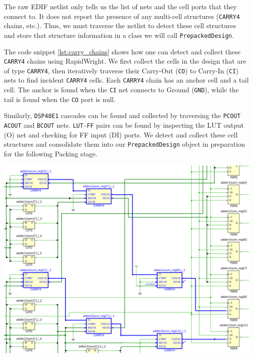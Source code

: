 \begin{multicols}{2}
The raw EDIF netlist only tells us the list of nets and the cell ports that they connect to. 
It does not report the presence of any multi-cell structures (\texttt{CARRY4} chains, etc.). 
Thus, we must traverse the netlist to detect these cell structures and store that structure information in a class we will call \texttt{PrepackedDesign}.

The code snippet \ref{lst:carry_chains} shows how one can detect and collect these \texttt{CARRY4} chains using RapidWright. 
We first collect the cells in the design that are of type \texttt{CARRY4}, then iteratively traverse their Carry-Out (\texttt{CO}) to Carry-In (\texttt{CI}) nets to find incident \texttt{CARRY4} cells.
Each \texttt{CARRY4} chain has an anchor cell and a tail cell.
The anchor is found when the \texttt{CI} net connects to Ground (\texttt{GND}), while the tail is found when the \texttt{CO} port is null. 

Similarly, \texttt{DSP48E1} cascades can be found and collected by traversing the \texttt{PCOUT} \texttt{ACOUT} and \texttt{BCOUT} nets.
\texttt{LUT-FF} pairs can be found by inspecting the LUT output (O) net and checking for FF input (DI) ports. 
We detect and collect these cell structures and consolidate them into our \texttt{PrepackedDesign} object in preparation for the following Packing stage. 


\end{multicols}
{
    \centering
    \includegraphics[width=0.8\columnwidth]{figures/carry_chain_traversal.png}
    \label{fig:carry_chain_traversal}
}
